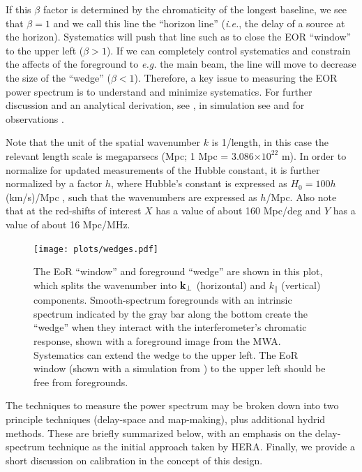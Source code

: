 \documentclass[preprint,11pt]{aastex}
\newcommand{\kvec}{{\bf k}}
\newcommand{\kvpr}{{\kvec_\perp}}
\def\kpar{k_{\|}}
\begin{document}
If this $\beta$ factor is determined by the chromaticity of the longest baseline, we see that $\beta=1$ and we call this line the ``horizon line'' ({\em i.e.}, the delay of a source at the horizon).  Systematics will push that line such as to close the EOR ``window'' to the upper left ($\beta > 1$).  If we can completely control systematics and constrain the affects of the foreground to {\em e.g.} the main beam, the line will move to decrease the size of the ``wedge'' ($\beta<1$).
Therefore, a key issue to measuring the EOR power spectrum is to understand and minimize systematics.  For further discussion and an analytical derivation, see \cite{zahn_etal2012,vedantham_2012,liu_et_al2014b},  in simulation see \cite{datta_etal2010,hazelton_et_al2013} and for observations
\cite{pober_etal2013b,2015arXiv150601026P,parsons_etal2014,2015arXiv150206016A}.  

Note that the unit of the spatial wavenumber $k$ is 1/length, in this case the relevant length scale is megaparsecs (Mpc; 1 Mpc = 3.086$\times10^{22}$ m).  In order to normalize for updated measurements of the Hubble constant, it is further normalized by a factor $h$, where Hubble's constant is expressed as $H_0=100h$ (km/s)/Mpc , such that the wavenumbers are expressed as $h$/Mpc.  Also note that at the red-shifts of interest $X$ has a value of about 160 Mpc/deg and $Y$ has a value of about 16 Mpc/MHz.

\begin{figure}[t]
\centerline{
\texttt{[image: plots/wedges.pdf]}
}
\caption{The EoR ``window'' and foreground ``wedge'' are shown in this plot, which splits the wavenumber into $\kvpr$ (horizontal) and $\kpar$ (vertical) components.
Smooth-spectrum foregrounds with an intrinsic spectrum indicated by the gray bar along the bottom create the ``wedge'' when they interact with the interferometer's chromatic response, shown with a foreground image from the MWA.  Systematics can extend the wedge to the upper left.  The EoR window (shown with a simulation
from \citealt{mesinger_et_al2011}) to the upper left should be free from foregrounds.}
\label{fig:wedge}
\end{figure}

The techniques to measure the power spectrum may be broken down into two principle techniques (delay-space and map-making), plus additional hydrid methods.  These are briefly summarized below, with an emphasis on the delay-spectrum technique as the initial approach taken by HERA.  Finally, we provide a short discussion on calibration in the concept of this design.
\end{document}
